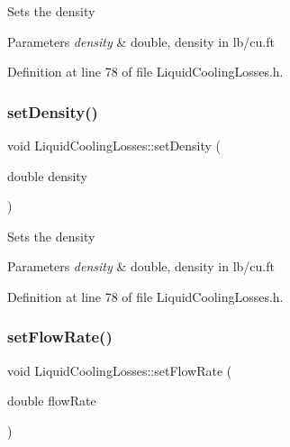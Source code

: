 Sets the density 
\begin{DoxyParams}{Parameters}
{\em density} & double, density in lb/cu.\+ft \\
\hline
\end{DoxyParams}


Definition at line 78 of file Liquid\+Cooling\+Losses.\+h.

\mbox{\label{class_liquid_cooling_losses_a1fcb1780b588e0a6e5ca052ce2b360dc}} 
\subsubsection{\texorpdfstring{set\+Density()}{setDensity()}\hspace{0.1cm}{\footnotesize\ttfamily [3/3]}}
{\footnotesize\ttfamily void Liquid\+Cooling\+Losses\+::set\+Density (\begin{DoxyParamCaption}\item[{double}]{density }\end{DoxyParamCaption})\hspace{0.3cm}{\ttfamily [inline]}}

Sets the density 
\begin{DoxyParams}{Parameters}
{\em density} & double, density in lb/cu.\+ft \\
\hline
\end{DoxyParams}


Definition at line 78 of file Liquid\+Cooling\+Losses.\+h.

\mbox{\label{class_liquid_cooling_losses_a7739742c5f21919a62c304b7c525b1b6}} 
\subsubsection{\texorpdfstring{set\+Flow\+Rate()}{setFlowRate()}\hspace{0.1cm}{\footnotesize\ttfamily [1/3]}}
{\footnotesize\ttfamily void Liquid\+Cooling\+Losses\+::set\+Flow\+Rate (\begin{DoxyParamCaption}\item[{double}]{flow\+Rate }\end{DoxyParamCaption})\hspace{0.3cm}{\ttfamily [inline]}}

